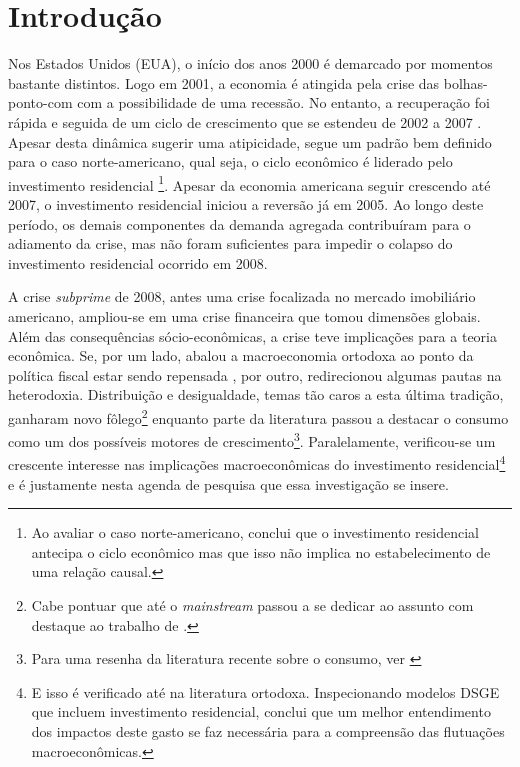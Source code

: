 \chapter{Introdução}

Nos Estados Unidos (EUA), o início dos anos 2000 é demarcado por momentos bastante distintos. Logo em 2001, a economia é atingida pela crise das bolhas-ponto-com com a possibilidade de uma recessão. No entanto, a recuperação foi rápida e seguida de um ciclo de crescimento que se estendeu de 2002 a 2007 \cite{cagnin_o_2007}. Apesar desta dinâmica sugerir uma atipicidade, segue um padrão bem definido para o caso norte-americano, qual seja, o ciclo econômico é liderado pelo investimento residencial \cites{green_follow_1997}{leamer_housing_2007}{fiebiger_trend_2017}\footnote{
	Ao avaliar o caso norte-americano, \textcite{green_follow_1997} conclui que o investimento residencial antecipa o ciclo econômico mas que isso não implica no estabelecimento de uma relação causal. 
}. Apesar da economia americana seguir crescendo até 2007, o investimento residencial iniciou a reversão já em 2005. Ao longo deste período, os demais componentes da demanda agregada contribuíram para o adiamento da crise, mas não foram suficientes para impedir o colapso do investimento residencial ocorrido em 2008. 

A crise \textit{subprime} de 2008, antes uma crise focalizada no mercado imobiliário americano, ampliou-se em uma crise financeira que tomou dimensões globais. Além das consequências sócio-econômicas, a crise teve implicações para a teoria econômica. Se, por um lado, abalou a macroeconomia ortodoxa ao ponto da política fiscal estar sendo repensada \cite{blanchard_rethinking_2017}, por outro, redirecionou algumas pautas na heterodoxia. Distribuição e desigualdade, temas tão caros a esta última tradição, ganharam novo fôlego\footnote{Cabe pontuar que até o \textit{mainstream} passou a se dedicar ao assunto com destaque ao trabalho de \textcite{piketty_o_2014}.} \cites{carvalho_personal_2016}{ederer_will_2019} enquanto parte da literatura passou a destacar o consumo como um dos possíveis motores de crescimento\footnote{Para uma resenha da literatura recente sobre o consumo, ver \textcite{brochier_macroeconomics_2017}}. Paralelamente, verificou-se um crescente interesse nas implicações macroeconômicas do investimento residencial\footnote{E isso é verificado até na literatura ortodoxa. Inspecionando modelos DSGE que incluem investimento residencial, \textcite{iacoviello_housing_2010} conclui que um melhor entendimento dos impactos deste gasto se faz necessária para a compreensão das flutuações macroeconômicas.} \cites{teixeira_crescimento_2015}{fiebiger_semi-autonomous_2018} e é justamente nesta agenda de pesquisa que essa investigação se insere. 

